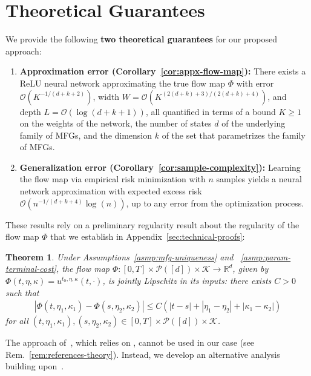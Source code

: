 \documentclass[11pt,reqno]{amsart}
\numberwithin{equation}{section}
\theoremstyle{plain}
\newtheorem{theorem}{Theorem}[section]
\newcommand{\R}{\mathbb{R}}
\newcommand{\calK}{{\mathcal K}}
\newcommand{\calP}{{\mathcal P}}
\newcommand{\1}{\boldsymbol{\mathbbm{1}}}
\begin{document}
\section{Theoretical Guarantees}
\label{sec:guarantees}

We provide the following {\bf two theoretical guarantees} for our proposed approach:
\begin{enumerate}
    \item[(1)] \textbf{Approximation error (Corollary~\ref{cor:appx-flow-map}):} There exists a ReLU neural network approximating the true flow map $\Phi$ with error $\mathcal{O}(K^{-1/(d + k + 2)})$, width $W = \mathcal{O}(K^{(2(d + k) + 3)/(2(d + k) + 4)})$, and depth $L = \mathcal{O}(\log(d + k + 1))$, all quantified in terms of a bound $K \geq 1$ on the weights of the network, the number of states $d$ of the underlying family of MFGs, and the dimension $k$ of the set that parametrizes the family of MFGs.
    \item[(2)] \textbf{Generalization error (Corollary~\ref{cor:sample-complexity}):} Learning the flow map via empirical risk minimization with $n$ samples yields a neural network approximation with expected excess risk $\mathcal{O}(n^{-1/(d + k + 4)} \log(n))$, up to any error from the optimization process.
\end{enumerate}

These results rely on a preliminary regularity result about the regularity of the flow map $\Phi$ that we establish in Appendix~\ref{sec:technical-proofs}:
\begin{theorem}
\label{thm:flow-time-regularity}
Under Assumptions~\ref{asmp:mfg-uniqueness} and ~\ref{asmp:param-terminal-cost}, the flow map $\Phi : [0, T] \times \calP([d]) \times \calK \to \R^d$, given by $\Phi(t, \eta, \kappa) = u^{t_0, \eta, \kappa}(t, \cdot)$, is jointly Lipschitz in its inputs: there exists $C > 0$ such that
\begin{align*}
    |\Phi(t, \eta_1, \kappa_1) - \Phi(s, \eta_2, \kappa_2)| \leq C(|t - s| + |\eta_1 - \eta_2| + |\kappa_1 - \kappa_2|)
\end{align*}
for all $(t, \eta_1, \kappa_1), (s, \eta_2, \kappa_2) \in [0, T] \times \calP([d]) \times \calK$.
\end{theorem}
The approach of~\cite{Lanthaler2025}, which relies on \cite[Theorem 1]{Yarotsky2017}, cannot be used in our case (see Rem.~\ref{rem:references-theory}). Instead, we develop an alternative analysis building upon~\cite{Jiao2023}. 
\end{document}
